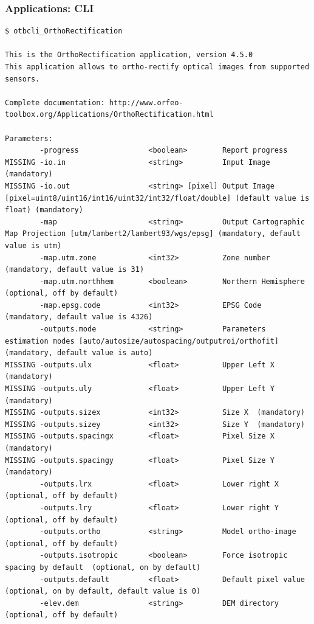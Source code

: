 \documentclass[8pt]{beamer}
\begin{document}
\begin{frame}[fragile]
\frametitle{Applications: CLI}
\begin{scriptsize}
\vspace{-0.5cm}\begin{verbatim}
$ otbcli_OrthoRectification

This is the OrthoRectification application, version 4.5.0
This application allows to ortho-rectify optical images from supported sensors.

Complete documentation: http://www.orfeo-toolbox.org/Applications/OrthoRectification.html

Parameters: 
        -progress                <boolean>        Report progress 
MISSING -io.in                   <string>         Input Image  (mandatory)
MISSING -io.out                  <string> [pixel] Output Image  [pixel=uint8/uint16/int16/uint32/int32/float/double] (default value is float) (mandatory)
        -map                     <string>         Output Cartographic Map Projection [utm/lambert2/lambert93/wgs/epsg] (mandatory, default value is utm)
        -map.utm.zone            <int32>          Zone number  (mandatory, default value is 31)
        -map.utm.northhem        <boolean>        Northern Hemisphere  (optional, off by default)
        -map.epsg.code           <int32>          EPSG Code  (mandatory, default value is 4326)
        -outputs.mode            <string>         Parameters estimation modes [auto/autosize/autospacing/outputroi/orthofit] (mandatory, default value is auto)
MISSING -outputs.ulx             <float>          Upper Left X  (mandatory)
MISSING -outputs.uly             <float>          Upper Left Y  (mandatory)
MISSING -outputs.sizex           <int32>          Size X  (mandatory)
MISSING -outputs.sizey           <int32>          Size Y  (mandatory)
MISSING -outputs.spacingx        <float>          Pixel Size X  (mandatory)
MISSING -outputs.spacingy        <float>          Pixel Size Y  (mandatory)
        -outputs.lrx             <float>          Lower right X  (optional, off by default)
        -outputs.lry             <float>          Lower right Y  (optional, off by default)
        -outputs.ortho           <string>         Model ortho-image  (optional, off by default)
        -outputs.isotropic       <boolean>        Force isotropic spacing by default  (optional, on by default)
        -outputs.default         <float>          Default pixel value  (optional, on by default, default value is 0)
        -elev.dem                <string>         DEM directory  (optional, off by default)

\end{verbatim}
\end{scriptsize}
\end{frame}
\end{document}
